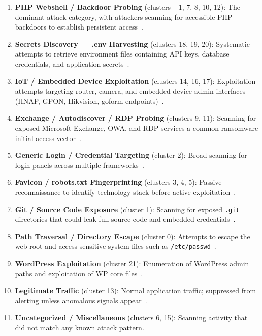 \documentclass[12pt, a4paper]{report}   %
\begin{document}
\begin{enumerate}[label=\alph*.]
  \item \textbf{PHP Webshell / Backdoor Probing} (clusters $-1$, 7, 8, 10, 12):
        The dominant attack category, with attackers scanning for accessible PHP
        backdoors to establish persistent access~\cite{exploit-db}.
  \item \textbf{Secrets Discovery --- .env Harvesting} (clusters 18, 19, 20):
        Systematic attempts to retrieve environment files containing API keys,
        database credentials, and application 
        secrets~\cite{owasp-api8,github-sensitive-data}.
  \item \textbf{IoT / Embedded Device Exploitation} (clusters 14, 16, 17):
        Exploitation attempts targeting router, camera, and embedded device admin
        interfaces (HNAP, GPON, Hikvision, goform endpoints)~\cite{mitre-recon}.
  \item \textbf{Exchange / Autodiscover / RDP Probing} (clusters 9, 11):
        Scanning for exposed Microsoft Exchange, OWA, and RDP services a common
        ransomware initial-access vector~\cite{mitre-recon}.
  \item \textbf{Generic Login / Credential Targeting} (cluster 2):
        Broad scanning for login panels across multiple 
        frameworks~\cite{fortinet-brute-force}.
  \item \textbf{Favicon / robots.txt Fingerprinting} (clusters 3, 4, 5):
        Passive reconnaissance to identify technology stack before active 
        exploitation~\cite{mitre-recon}.
  \item \textbf{Git / Source Code Exposure} (cluster 1):
        Scanning for exposed \texttt{.git} directories that could leak full source
        code and embedded credentials~\cite{github-sensitive-data}.
  \item \textbf{Path Traversal / Directory Escape} (cluster 0):
        Attempts to escape the web root and access sensitive system files such as
        \texttt{/etc/passwd}~\cite{owasp-waf}.
  \item \textbf{WordPress Exploitation} (cluster 21):
        Enumeration of WordPress admin paths and exploitation of WP core 
        files~\cite{wp-king-addons}.
  \item \textbf{Legitimate Traffic} (cluster 13):
        Normal application traffic; suppressed from alerting unless anomalous
        signals appear~\cite{cf-verified-bots}.
  \item \textbf{Uncategorized / Miscellaneous} (clusters 6, 15):
        Scanning activity that did not match any known attack pattern.
\end{enumerate}
\end{document}
